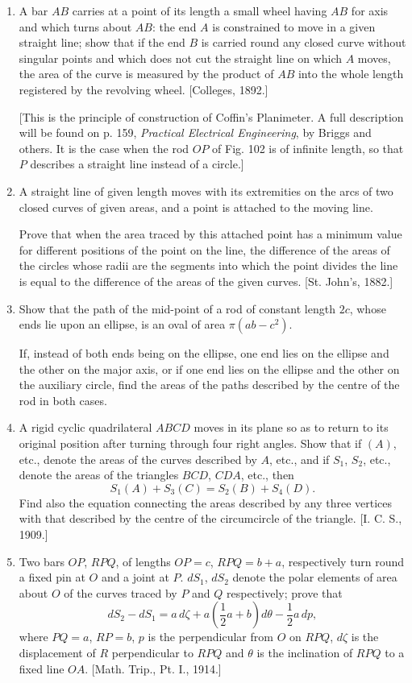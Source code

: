 \documentclass[11pt, a4paper]{article}
\newcommand{\source}[1]{\hfill\textnormal{[#1]}}
\begin{document}
\begin{enumerate}[leftmargin=2em]
\item A bar $AB$ carries at a point of its length a small wheel having $AB$ for axis and which turns about $AB$: the end $A$ is constrained to move in a given straight line; show that if the end $B$ is carried round any closed curve without singular points and which does not cut the straight line on which $A$ moves, the area of the curve is measured by the product of $AB$ into the whole length registered by the revolving wheel. \source{Colleges, 1892.}

[This is the principle of construction of Coffin's Planimeter. A full description will be found on p. 159, \textit{Practical Electrical Engineering}, by Briggs and others. It is the case when the rod $OP$ of Fig. 102 is of infinite length, so that $P$ describes a straight line instead of a circle.]

\item A straight line of given length moves with its extremities on the arcs of two closed curves of given areas, and a point is attached to the moving line.

Prove that when the area traced by this attached point has a minimum value for different positions of the point on the line, the difference of the areas of the circles whose radii are the segments into which the point divides the line is equal to the difference of the areas of the given curves. \source{St. John's, 1882.}

\item Show that the path of the mid-point of a rod of constant length $2c$, whose ends lie upon an ellipse, is an oval of area $\pi(ab-c^2)$.

If, instead of both ends being on the ellipse, one end lies on the ellipse and the other on the major axis, or if one end lies on the ellipse and the other on the auxiliary circle, find the areas of the paths described by the centre of the rod in both cases.

\item A rigid cyclic quadrilateral $ABCD$ moves in its plane so as to return to its original position after turning through four right angles. Show that if $(A)$, etc., denote the areas of the curves described by $A$, etc., and if $S_1$, $S_2$, etc., denote the areas of the triangles $BCD$, $CDA$, etc., then
\[
S_1(A)+S_3(C)=S_2(B)+S_4(D).
\]
Find also the equation connecting the areas described by any three vertices with that described by the centre of the circumcircle of the triangle. \source{I. C. S., 1909.}

\item Two bars $OP$, $RPQ$, of lengths $OP=c$, $RPQ=b+a$, respectively turn round a fixed pin at $O$ and a joint at $P$. $dS_1$, $dS_2$ denote the polar elements of area about $O$ of the curves traced by $P$ and $Q$ respectively; prove that
\[
dS_2-dS_1=a\,d\zeta+a\left(\frac12a+b\right)d\theta-\frac12a\,dp,
\]
where $PQ=a$, $RP=b$, $p$ is the perpendicular from $O$ on $RPQ$, $d\zeta$ is the displacement of $R$ perpendicular to $RPQ$ and $\theta$ is the inclination of $RPQ$ to a fixed line $OA$. \source{Math. Trip., Pt. I., 1914.}

\end{enumerate}
\end{document}
